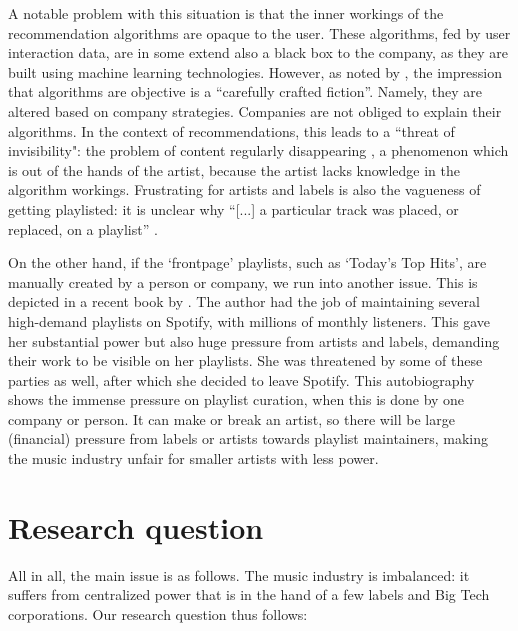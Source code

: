 A notable problem with this situation is that the inner workings of the recommendation algorithms are opaque to the user. These algorithms, fed by user interaction data, are in some extend also a black box to the company, as they are built using machine learning technologies. However, as noted by \citep{gillespie2014relevance}, the impression that algorithms are objective is a ``carefully crafted fiction''. Namely, they are altered based on company strategies. Companies are not obliged to explain their algorithms. In the context of recommendations, this leads to a ``threat of invisibility": the problem of content regularly disappearing \citep{bucher2018if}, a phenomenon which is out of the hands of the artist, because the artist lacks knowledge in the algorithm workings. Frustrating for artists and labels is also the vagueness of getting playlisted: it is unclear why ``[...] a particular track was placed, or replaced, on a playlist'' \citep{prey2020locating}. 

On the other hand, if the `frontpage' playlists, such as `Today's Top Hits', are manually created by a person or company, we run into another issue. This is depicted in a recent book by \cite{heuvelings2020}. The author had the job of maintaining several high-demand playlists on Spotify, with millions of monthly listeners. This gave her substantial power but also huge pressure from artists and labels, demanding their work to be visible on her playlists. She was threatened by some of these parties as well, after which she decided to leave Spotify. This autobiography shows the immense pressure on playlist curation, when this is done by one company or person. It can make or break an artist, so there will be large (financial) pressure from labels or artists towards playlist maintainers, making the music industry unfair for smaller artists with less power.

\section{Research question}
All in all, the main issue is as follows. The music industry is imbalanced: it suffers from centralized power that is in the hand of a few labels and Big Tech corporations. Our research question thus follows:

